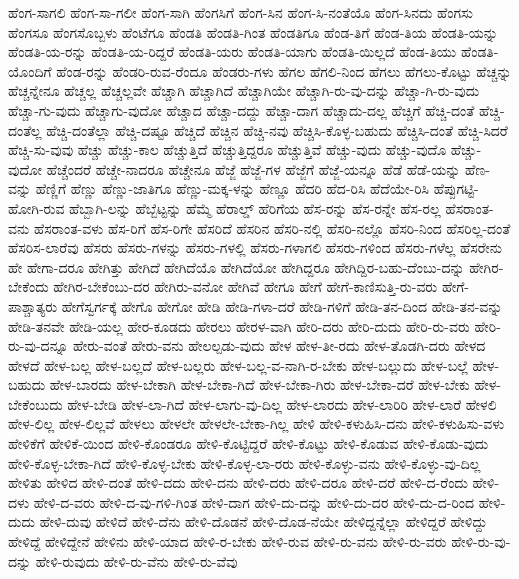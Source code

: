 {ಹೆಂಗ-ಸಾಗಲಿ
ಹೆಂಗ-ಸಾ-ಗಲೀ
ಹೆಂಗ-ಸಾಗಿ
ಹೆಂಗಸಿಗೆ
ಹೆಂಗ-ಸಿನ
ಹೆಂಗ-ಸಿ-ನಂತೆಯೊ
ಹೆಂಗ-ಸಿನದು
ಹೆಂಗಸು
ಹೆಂಗಸೂ
ಹೆಂಗಸೊಬ್ಬಳು
ಹೆಂಟೆಗೂ
ಹೆಂಡತಿ
ಹೆಂಡತಿ-ಗಿಂತ
ಹೆಂಡತಿಗೂ
ಹೆಂಡ-ತಿಗೆ
ಹೆಂಡ-ತಿಯ
ಹೆಂಡತಿ-ಯನ್ನು
ಹೆಂಡತಿ-ಯ-ರನ್ನು
ಹೆಂಡತಿ-ಯ-ರಿದ್ದರೆ
ಹೆಂಡತಿ-ಯರು
ಹೆಂಡತಿ-ಯಾಗು
ಹೆಂಡತಿ-ಯಿಲ್ಲದೆ
ಹೆಂಡ-ತಿಯು
ಹೆಂಡತಿ-ಯೊಂದಿಗೆ
ಹೆಂಡ-ರನ್ನು
ಹೆಂಡರಿ-ರುವ-ರೆಂದೂ
ಹೆಂಡರು-ಗಳು
ಹೆಗಲ
ಹೆಗಲಿ-ನಿಂದ
ಹೆಗಲು
ಹೆಗಲು-ಕೊಟ್ಟು
ಹೆಚ್ಚನ್ನು
ಹೆಚ್ಚನ್ನೇನೂ
ಹೆಚ್ಚಲ್ಲ
ಹೆಚ್ಚಲ್ಲವೇ
ಹೆಚ್ಚಾಗಿ
ಹೆಚ್ಚಾಗಿದೆ
ಹೆಚ್ಚಾಗಿಯೇ
ಹೆಚ್ಚಾಗಿ-ರು-ವು-ದನ್ನು
ಹೆಚ್ಚಾ-ಗಿ-ರು-ವುದು
ಹೆಚ್ಚಾ-ಗು-ವುದು
ಹೆಚ್ಚಾಗು-ವುದೋ
ಹೆಚ್ಚಾದ
ಹೆಚ್ಚಾ-ದದ್ದು
ಹೆಚ್ಚಾ-ದಾಗ
ಹೆಚ್ಚಾದು-ದಲ್ಲ
ಹೆಚ್ಚಿಗೆ
ಹೆಚ್ಚಿ-ದಂತೆ
ಹೆಚ್ಚಿ-ದಂತೆಲ್ಲ
ಹೆಚ್ಚಿ-ದಂತೆಲ್ಲಾ
ಹೆಚ್ಚಿ-ದಷ್ಟೂ
ಹೆಚ್ಚಿದೆ
ಹೆಚ್ಚಿನ
ಹೆಚ್ಚಿ-ನವು
ಹೆಚ್ಚಿಸಿ-ಕೊಳ್ಳ-ಬಹುದು
ಹೆಚ್ಚಿಸಿ-ದಂತೆ
ಹೆಚ್ಚಿ-ಸಿದರೆ
ಹೆಚ್ಚಿ-ಸು-ವುವು
ಹೆಚ್ಚು
ಹೆಚ್ಚು-ಕಾಲ
ಹೆಚ್ಚುತ್ತಿದೆ
ಹೆಚ್ಚುತ್ತಿದ್ದರೂ
ಹೆಚ್ಚುತ್ತಿವೆ
ಹೆಚ್ಚು-ವುದು
ಹೆಚ್ಚು-ವುದೊ
ಹೆಚ್ಚು-ವುದೋ
ಹೆಚ್ಚೆಂದರೆ
ಹೆಚ್ಚೇ-ನಾದರೂ
ಹೆಚ್ಚೇನೂ
ಹೆಜ್ಜೆ
ಹೆಜ್ಜೆ-ಗಳ
ಹೆಜ್ಜೆಗೆ
ಹೆಜ್ಜೆ-ಯನ್ನೂ
ಹೆಡೆ
ಹೆಡೆ-ಯನ್ನು
ಹೆಣ-ವನ್ನು
ಹೆಣ್ಣಿಗೆ
ಹೆಣ್ಣು
ಹೆಣ್ಣು-ಜಾತಿಗೂ
ಹೆಣ್ಣು-ಮಕ್ಕ-ಳನ್ನು
ಹೆಣ್ಣೂ
ಹೆದರಿ
ಹೆದ-ರಿಸಿ
ಹೆದೆಯೇ-ರಿಸಿ
ಹೆಪ್ಪುಗಟ್ಟಿ-ಹೋಗಿ-ರುವ
ಹೆಬ್ಬಾಗಿ-ಲನ್ನು
ಹೆಬ್ಬೆಟ್ಟನ್ನು
ಹೆಮ್ಮೆ
ಹೆರಾಲ್ಡ್
ಹೆರಿಗೆಯ
ಹೆಸ-ರನ್ನು
ಹೆಸ-ರನ್ನೇ
ಹೆಸ-ರಲ್ಲ
ಹೆಸರಾಂತ-ವನು
ಹೆಸರಾಂತ-ವಳು
ಹೆಸ-ರಿಗೆ
ಹೆಸ-ರಿಗೇ
ಹೆಸರಿದೆ
ಹೆಸರಿನ
ಹೆಸರಿ-ನಲ್ಲಿ
ಹೆಸರಿ-ನಲ್ಲೊ
ಹೆಸರಿ-ನಿಂದ
ಹೆಸರಿಲ್ಲ-ದಂತೆ
ಹೆಸರಿಸ-ಲಾರೆವು
ಹೆಸರು
ಹೆಸರು-ಗಳನ್ನು
ಹೆಸರು-ಗಳಲ್ಲಿ
ಹೆಸರು-ಗಳಾಗಲಿ
ಹೆಸರು-ಗಳಿಂದ
ಹೆಸರು-ಗಳೆಲ್ಲ
ಹೆಸರೇನು
ಹೇ
ಹೇಗಾ-ದರೂ
ಹೇಗಿತ್ತು
ಹೇಗಿದೆ
ಹೇಗಿದೆಯೊ
ಹೇಗಿದೆಯೋ
ಹೇಗಿದ್ದರೂ
ಹೇಗಿದ್ದಿರ-ಬಹು-ದೆಂಬು-ದನ್ನು
ಹೇಗಿರ-ಬೇಕೆಂದು
ಹೇಗಿರ-ಬೇಕೆಂಬು-ದರ
ಹೇಗಿರು-ವನೋ
ಹೇಗಿವೆ
ಹೇಗೂ
ಹೇಗೆ
ಹೇಗೆ-ಕಾಣಿಸುತ್ತಿ-ರು-ವರು
ಹೇಗೆ-ಪಾಶ್ಚಾತ್ಯರು
ಹೇಗೆಸ್ವರ್ಗಕ್ಕೆ
ಹೇಗೊ
ಹೇಗೋ
ಹೇಡಿ
ಹೇಡಿ-ಗಳಾ-ದರೆ
ಹೇಡಿ-ಗಳಿಗೆ
ಹೇಡಿ-ತನ-ದಿಂದ
ಹೇಡಿ-ತನ-ವನ್ನು
ಹೇಡಿ-ತನವೇ
ಹೇಡಿ-ಯಲ್ಲ
ಹೇರ-ಕೂಡದು
ಹೇರಲು
ಹೇರಳ-ವಾಗಿ
ಹೇರಿ-ದರು
ಹೇರಿ-ದುದು
ಹೇರಿ-ರು-ವರು
ಹೇರಿ-ರು-ವು-ದನ್ನೂ
ಹೇರು-ವಂತೆ
ಹೇರು-ವನು
ಹೇಲಲ್ಪಡು-ವುದು
ಹೇಳ
ಹೇಳ-ತೀ-ರದು
ಹೇಳ-ತೊಡಗಿ-ದರು
ಹೇಳದ
ಹೇಳದೆ
ಹೇಳ-ಬಲ್ಲ
ಹೇಳ-ಬಲ್ಲದೆ
ಹೇಳ-ಬಲ್ಲರು
ಹೇಳ-ಬಲ್ಲ-ವ-ನಾಗಿ-ರ-ಬೇಕು
ಹೇಳ-ಬಲ್ಲುದು
ಹೇಳ-ಬಲ್ಲೆ
ಹೇಳ-ಬಹುದು
ಹೇಳ-ಬಾರದು
ಹೇಳ-ಬೇಕಾಗಿ
ಹೇಳ-ಬೇಕಾ-ಗಿದೆ
ಹೇಳ-ಬೇಕಾ-ಗಿರು
ಹೇಳ-ಬೇಕಾ-ದರೆ
ಹೇಳ-ಬೇಕು
ಹೇಳ-ಬೇಕೆಂಬುದು
ಹೇಳ-ಬೇಡಿ
ಹೇಳ-ಲಾ-ಗಿದೆ
ಹೇಳ-ಲಾಗು-ವು-ದಿಲ್ಲ
ಹೇಳ-ಲಾರದು
ಹೇಳ-ಲಾರಿರಿ
ಹೇಳ-ಲಾರೆ
ಹೇಳಲಿ
ಹೇಳ-ಲಿಲ್ಲ
ಹೇಳ-ಲಿಲ್ಲವೆ
ಹೇಳಲು
ಹೇಳಲೇ
ಹೇಳಲೇ-ಬೇಕಾ-ಗಿಲ್ಲ
ಹೇಳಿ
ಹೇಳಿ-ಕಳುಹಿಸಿ-ದನು
ಹೇಳಿ-ಕಳುಹಿಸು-ವಳು
ಹೇಳಿಕೆಗೆ
ಹೇಳಿಕೆ-ಯಿಂದ
ಹೇಳಿ-ಕೊಂಡರೂ
ಹೇಳಿ-ಕೊಟ್ಟಿದ್ದರೆ
ಹೇಳಿ-ಕೊಟ್ಟು
ಹೇಳಿ-ಕೊಡುವ
ಹೇಳಿ-ಕೊಡು-ವುದು
ಹೇಳಿ-ಕೊಳ್ಳ-ಬೇಕಾ-ಗಿದೆ
ಹೇಳಿ-ಕೊಳ್ಳ-ಬೇಕು
ಹೇಳಿ-ಕೊಳ್ಳ-ಲಾ-ರರು
ಹೇಳಿ-ಕೊಳ್ಳು-ವನು
ಹೇಳಿ-ಕೊಳ್ಳು-ವು-ದಿಲ್ಲ
ಹೇಳಿತು
ಹೇಳಿದ
ಹೇಳಿ-ದಂತೆ
ಹೇಳಿ-ದದು
ಹೇಳಿ-ದನು
ಹೇಳಿ-ದರು
ಹೇಳಿ-ದರೂ
ಹೇಳಿ-ದರೆ
ಹೇಳಿ-ದ-ರೆಂದು
ಹೇಳಿ-ದಳು
ಹೇಳಿ-ದ-ವರು
ಹೇಳಿ-ದ-ವು-ಗಳಿ-ಗಿಂತ
ಹೇಳಿ-ದಾಗ
ಹೇಳಿ-ದು-ದನ್ನು
ಹೇಳಿ-ದು-ದರ
ಹೇಳಿ-ದು-ದ-ರಿಂದ
ಹೇಳಿ-ದುದು
ಹೇಳಿ-ದುವು
ಹೇಳಿದೆ
ಹೇಳಿ-ದೆನು
ಹೇಳಿ-ದೊಡನೆ
ಹೇಳಿ-ದೊಡ-ನೆಯೇ
ಹೇಳಿದ್ದನ್ನೆಲ್ಲಾ
ಹೇಳಿದ್ದರೆ
ಹೇಳಿದ್ದು
ಹೇಳಿದ್ದೆ
ಹೇಳಿದ್ದೇನೆ
ಹೇಳಿನು
ಹೇಳಿ-ಯಾದ
ಹೇಳಿ-ರ-ಬೇಕು
ಹೇಳಿ-ರುವ
ಹೇಳಿ-ರು-ವನು
ಹೇಳಿ-ರು-ವರು
ಹೇಳಿ-ರು-ವು-ದನ್ನು
ಹೇಳಿ-ರುವುದು
ಹೇಳಿ-ರು-ವೆನು
ಹೇಳಿ-ರು-ವೆವು
}
